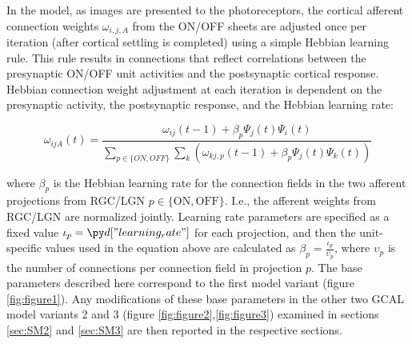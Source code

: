 \documentclass[utf8]{frontiersSCNS}
\begin{document}
In the model, as images are presented to the photoreceptors, the cortical afferent connection weights $\omega_{i,j,A}$ from the ON/OFF sheets are adjusted once per iteration (after cortical settling is completed) using a simple Hebbian learning rule. This rule results in connections that reflect correlations between the presynaptic ON/OFF unit activities and the postsynaptic cortical response. Hebbian connection weight adjustment at each iteration is dependent on the presynaptic activity, the postsynaptic response, and the Hebbian learning rate:

\begin{equation}
\omega_{ijA}(t)=\frac{\omega_{ij}(t-1)+\beta_{p}\Psi_{j}(t)\Psi_{i}(t)}{\sum_{p \in \{ON,OFF\}}\sum_{k}\left(\omega_{kj,p}(t-1)+\beta_{p}\Psi_{j}(t)\Psi_{k}(t)\right)}
\end{equation}

\noindent where $\beta_{p}$ is the Hebbian learning rate for the connection fields in the two afferent projections from RGC/LGN $p \in \{\mathrm{ON},\mathrm{OFF}\}$. I.e., the afferent weights from RGC/LGN are normalized jointly.  Learning rate parameters are specified as
a fixed value $\iota_{p}=\insval{learning_rate}$ for each projection, and then the unit-specific values used in the equation above are calculated as
$\beta_{p}=\frac{\iota_{p}}{\upsilon_{p}}$, where $\upsilon_{p}$ is the number of connections per connection field in projection $p$.  
The base parameters described here correspond to the first model variant (figure \ref{fig:figure1}). Any modifications of these base parameters in the other two GCAL model variants 2 and 3 (figure \ref{fig:figure2},\ref{fig:figure3}) examined in 
sections \ref{sec:SM2} and \ref{sec:SM3} are then reported in the respective sections.
\end{document}
